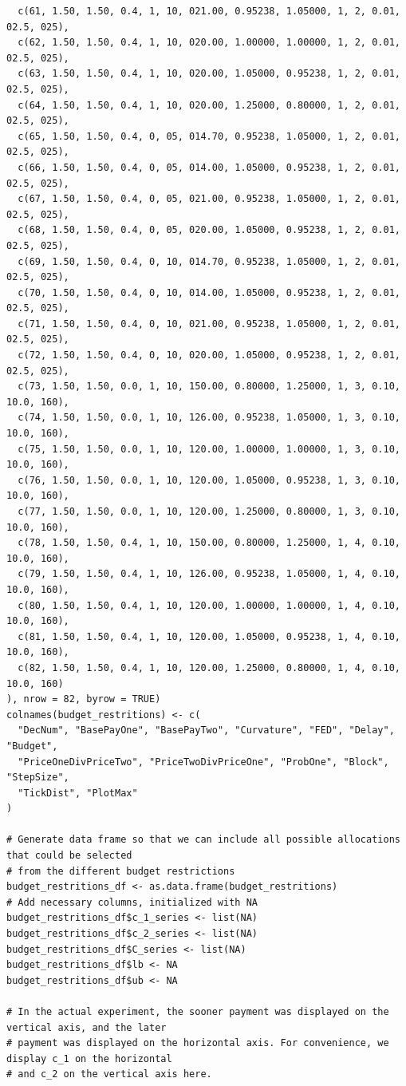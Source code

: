 \documentclass[11pt, a4paper, oneside]{article}
\theoremstyle{Plain}
\theoremstyle{Definition}
\theoremstyle{Remark}
\begin{document}
\begin{appendix}
\begin{lstlisting}
  c(61, 1.50, 1.50, 0.4, 1, 10, 021.00, 0.95238, 1.05000, 1, 2, 0.01, 02.5, 025),
  c(62, 1.50, 1.50, 0.4, 1, 10, 020.00, 1.00000, 1.00000, 1, 2, 0.01, 02.5, 025),
  c(63, 1.50, 1.50, 0.4, 1, 10, 020.00, 1.05000, 0.95238, 1, 2, 0.01, 02.5, 025),
  c(64, 1.50, 1.50, 0.4, 1, 10, 020.00, 1.25000, 0.80000, 1, 2, 0.01, 02.5, 025),
  c(65, 1.50, 1.50, 0.4, 0, 05, 014.70, 0.95238, 1.05000, 1, 2, 0.01, 02.5, 025),
  c(66, 1.50, 1.50, 0.4, 0, 05, 014.00, 1.05000, 0.95238, 1, 2, 0.01, 02.5, 025),
  c(67, 1.50, 1.50, 0.4, 0, 05, 021.00, 0.95238, 1.05000, 1, 2, 0.01, 02.5, 025),
  c(68, 1.50, 1.50, 0.4, 0, 05, 020.00, 1.05000, 0.95238, 1, 2, 0.01, 02.5, 025),
  c(69, 1.50, 1.50, 0.4, 0, 10, 014.70, 0.95238, 1.05000, 1, 2, 0.01, 02.5, 025),
  c(70, 1.50, 1.50, 0.4, 0, 10, 014.00, 1.05000, 0.95238, 1, 2, 0.01, 02.5, 025),
  c(71, 1.50, 1.50, 0.4, 0, 10, 021.00, 0.95238, 1.05000, 1, 2, 0.01, 02.5, 025),
  c(72, 1.50, 1.50, 0.4, 0, 10, 020.00, 1.05000, 0.95238, 1, 2, 0.01, 02.5, 025),
  c(73, 1.50, 1.50, 0.0, 1, 10, 150.00, 0.80000, 1.25000, 1, 3, 0.10, 10.0, 160),
  c(74, 1.50, 1.50, 0.0, 1, 10, 126.00, 0.95238, 1.05000, 1, 3, 0.10, 10.0, 160),
  c(75, 1.50, 1.50, 0.0, 1, 10, 120.00, 1.00000, 1.00000, 1, 3, 0.10, 10.0, 160),
  c(76, 1.50, 1.50, 0.0, 1, 10, 120.00, 1.05000, 0.95238, 1, 3, 0.10, 10.0, 160),
  c(77, 1.50, 1.50, 0.0, 1, 10, 120.00, 1.25000, 0.80000, 1, 3, 0.10, 10.0, 160),
  c(78, 1.50, 1.50, 0.4, 1, 10, 150.00, 0.80000, 1.25000, 1, 4, 0.10, 10.0, 160),
  c(79, 1.50, 1.50, 0.4, 1, 10, 126.00, 0.95238, 1.05000, 1, 4, 0.10, 10.0, 160),
  c(80, 1.50, 1.50, 0.4, 1, 10, 120.00, 1.00000, 1.00000, 1, 4, 0.10, 10.0, 160),
  c(81, 1.50, 1.50, 0.4, 1, 10, 120.00, 1.05000, 0.95238, 1, 4, 0.10, 10.0, 160),
  c(82, 1.50, 1.50, 0.4, 1, 10, 120.00, 1.25000, 0.80000, 1, 4, 0.10, 10.0, 160)
), nrow = 82, byrow = TRUE)
colnames(budget_restritions) <- c(
  "DecNum", "BasePayOne", "BasePayTwo", "Curvature", "FED", "Delay", "Budget",
  "PriceOneDivPriceTwo", "PriceTwoDivPriceOne", "ProbOne", "Block", "StepSize",
  "TickDist", "PlotMax"
)

# Generate data frame so that we can include all possible allocations that could be selected
# from the different budget restrictions
budget_restritions_df <- as.data.frame(budget_restritions)
# Add necessary columns, initialized with NA
budget_restritions_df$c_1_series <- list(NA)
budget_restritions_df$c_2_series <- list(NA)
budget_restritions_df$C_series <- list(NA)
budget_restritions_df$lb <- NA
budget_restritions_df$ub <- NA

# In the actual experiment, the sooner payment was displayed on the vertical axis, and the later
# payment was displayed on the horizontal axis. For convenience, we display c_1 on the horizontal
# and c_2 on the vertical axis here.


\end{lstlisting}
\end{appendix}
\end{document}
